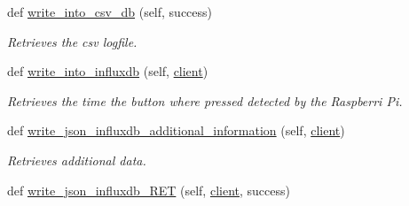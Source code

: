 \begin{DoxyCompactItemize}
def \hyperlink{classRET__data__processing_1_1RET__data__processing_a21a0d75a00e8245a7d8cb7853663e3ea}{write\+\_\+into\+\_\+csv\+\_\+db} (self, success)
\begin{DoxyCompactList}\small\item\em Retrieves the csv logfile. \end{DoxyCompactList}\item 
def \hyperlink{classRET__data__processing_1_1RET__data__processing_a8edbf01e68042082bbe5bc8c967f710e}{write\+\_\+into\+\_\+influxdb} (self, \hyperlink{classRET__data__processing_1_1RET__data__processing_ad5bc32b75da65fe60067f501a4bb6665}{client})
\begin{DoxyCompactList}\small\item\em Retrieves the time the button where pressed detected by the Raspberri Pi. \end{DoxyCompactList}\item 
def \hyperlink{classRET__data__processing_1_1RET__data__processing_a7ced1bb55d644f56ba40295ffed86c92}{write\+\_\+json\+\_\+influxdb\+\_\+additional\+\_\+information} (self, \hyperlink{classRET__data__processing_1_1RET__data__processing_ad5bc32b75da65fe60067f501a4bb6665}{client})
\begin{DoxyCompactList}\small\item\em Retrieves additional data. \end{DoxyCompactList}\item 
def \hyperlink{classRET__data__processing_1_1RET__data__processing_adf8798aae1ab2f5933be5028e19c4228}{write\+\_\+json\+\_\+influxdb\+\_\+\+R\+ET} (self, \hyperlink{classRET__data__processing_1_1RET__data__processing_ad5bc32b75da65fe60067f501a4bb6665}{client}, success)
\end{DoxyCompactItemize}
